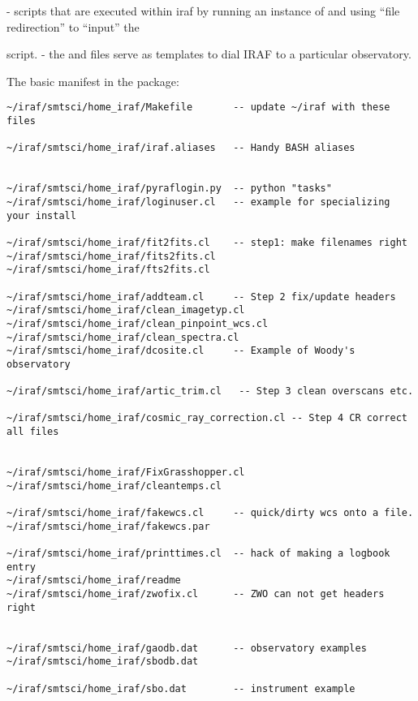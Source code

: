 \documentclass[letter,11pt,oneside]{article}
\begin{document}
- {\color{verbcolor}{\verb#.cl#}} scripts that are executed within
iraf by running an instance of {\color{verbcolor}{\verb#cl#}} and
using ``file redirection'' to ``input'' the
{\color{verbcolor}{\verb#~/iraf/smtsci/home_bin/xxx.cl#} script.
- the {\color{verbcolor}{\verb#.dat#}} and {\color{verbcolor}{\verb#.db#}}
files serve as templates to dial IRAF to a particular observatory.

The basic manifest in the package:



\begingroup \fontsize{10pt}{10pt}
\selectfont
\begin{verbatim} 
~/iraf/smtsci/home_iraf/Makefile       -- update ~/iraf with these files

~/iraf/smtsci/home_iraf/iraf.aliases   -- Handy BASH aliases


~/iraf/smtsci/home_iraf/pyraflogin.py  -- python "tasks"
~/iraf/smtsci/home_iraf/loginuser.cl   -- example for specializing your install

~/iraf/smtsci/home_iraf/fit2fits.cl    -- step1: make filenames right
~/iraf/smtsci/home_iraf/fits2fits.cl
~/iraf/smtsci/home_iraf/fts2fits.cl

~/iraf/smtsci/home_iraf/addteam.cl     -- Step 2 fix/update headers
~/iraf/smtsci/home_iraf/clean_imagetyp.cl
~/iraf/smtsci/home_iraf/clean_pinpoint_wcs.cl
~/iraf/smtsci/home_iraf/clean_spectra.cl
~/iraf/smtsci/home_iraf/dcosite.cl     -- Example of Woody's observatory

~/iraf/smtsci/home_iraf/artic_trim.cl   -- Step 3 clean overscans etc.

~/iraf/smtsci/home_iraf/cosmic_ray_correction.cl -- Step 4 CR correct all files 


~/iraf/smtsci/home_iraf/FixGrasshopper.cl
~/iraf/smtsci/home_iraf/cleantemps.cl

~/iraf/smtsci/home_iraf/fakewcs.cl     -- quick/dirty wcs onto a file.
~/iraf/smtsci/home_iraf/fakewcs.par

~/iraf/smtsci/home_iraf/printtimes.cl  -- hack of making a logbook entry
~/iraf/smtsci/home_iraf/readme
~/iraf/smtsci/home_iraf/zwofix.cl      -- ZWO can not get headers right


~/iraf/smtsci/home_iraf/gaodb.dat      -- observatory examples
~/iraf/smtsci/home_iraf/sbodb.dat

~/iraf/smtsci/home_iraf/sbo.dat        -- instrument example



\end{verbatim}}
\end{document}
